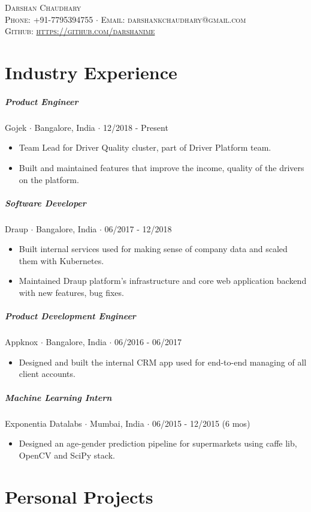 \documentclass[10pt,letterpaper]{article}
\newcommand{\namestyle}{\Huge \scshape}
\newcommand{\addressstyle}{\color{addresscolor} \footnotesize \rmfamily \upshape}
\begin{document}
\begin{center}
    \namestyle Darshan Chaudhary \\[0.3em]
    \addressstyle Phone: +91-7795394755  $\cdot$  Email: darshankchaudhary@gmail.com \\
    Github: \url{https://github.com/darshanime}
\end{center}

\small
\section*{Industry Experience}

\subparagraph{Product Engineer}
Gojek $\cdot$ Bangalore, India $\cdot$ 12/2018 - Present
\begin{itemize}
    \item Team Lead for Driver Quality cluster, part of Driver Platform team.
    \item Built and maintained features that improve the income, quality of the drivers on the platform.
\end{itemize}

\subparagraph{Software Developer}
Draup $\cdot$ Bangalore, India $\cdot$ 06/2017 - 12/2018
\begin{itemize}
    \item Built internal services used for making sense of company data and scaled them with Kubernetes.
    \item Maintained Draup platform's infrastructure and core web application backend with new features, bug fixes.
\end{itemize}

\subparagraph{Product Development Engineer}
Appknox $\cdot$ Bangalore, India $\cdot$ 06/2016 - 06/2017
\begin{itemize}
    \item Designed and built the internal CRM app used for end-to-end managing of all client accounts.
\end{itemize}

\subparagraph{Machine Learning Intern}
Exponentia Datalabs $\cdot$ Mumbai, India $\cdot$ 06/2015 - 12/2015 (6 mos)
\begin{itemize}
    \item Designed an age-gender prediction pipeline for supermarkets using caffe lib, OpenCV and SciPy stack.
\end{itemize}


\section*{Personal Projects}
\end{document}
